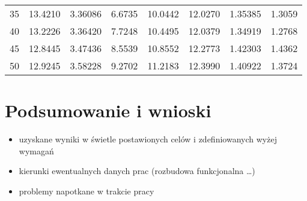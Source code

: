 \documentclass[a4paper,twoside,12pt]{book}
\begin{document}
\begin{table}
\begin{tabular}{rrrrrrrr}
	      35 & 13.4210 & 3.36086 &       6.6735 &    10.0442 &    12.0270 & 1.35385 &                       1.3059 \\
	      40 & 13.2226 & 3.36420 &       7.7248 &    10.4495 &    12.0379 & 1.34919 &                       1.2768 \\
	      45 & 12.8445 & 3.47436 &       8.5539 &    10.8552 &    12.2773 & 1.42303 &                       1.4362 \\
	      50 & 12.9245 & 3.58228 &       9.2702 &    11.2183 &    12.3990 & 1.40922 &                       1.3724 \\
\bottomrule
\end{tabular}
\end{table}  



\chapter{Podsumowanie i wnioski}
\begin{itemize}
\item uzyskane wyniki w świetle postawionych celów i zdefiniowanych wyżej wymagań
\item kierunki ewentualnych danych prac (rozbudowa funkcjonalna …)
\item problemy napotkane w trakcie pracy
\end{itemize}



\backmatter

\printbibliography           %
\end{document}
